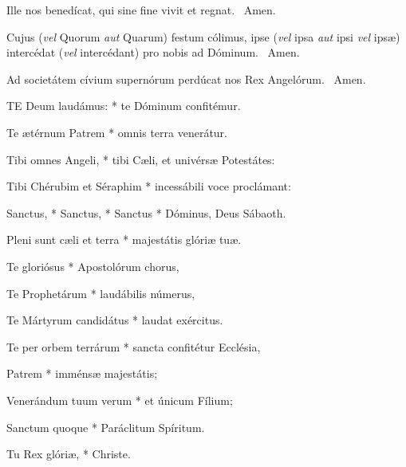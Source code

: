 
 Ille nos benedícat, qui sine fine vivit et regnat. \R\ Amen.

 Cujus (\textit{vel} Quorum \textit{aut} Quarum) festum cólimus, ipse (\textit{vel} ipsa \textit{aut} ipsi \textit{vel} ipsæ) intercédat (\textit{vel} intercédant) pro nobis ad Dóminum. \R\ Amen.

 Ad societátem cívium supernórum perdúcat nos Rex Angelórum. \R\ Amen.




\lettrine[lines=2]{T}{E} Deum laudámus: * te Dóminum confitémur.

Te ætérnum Patrem * omnis terra venerátur.

Tibi omnes Angeli, * tibi Cæli, et univérsæ Potestátes:

Tibi Chérubim et Séraphim * incessábili voce proclámant:

Sanctus, * Sanctus, * Sanctus * Dóminus, Deus Sábaoth.

Pleni sunt cæli et terra * majestátis glóriæ tuæ.

Te gloriósus * Apostolórum chorus,

Te Prophetárum * laudábilis númerus,

Te Mártyrum candidátus * laudat exércitus.

Te per orbem terrárum * sancta confitétur Ecclésia,

Patrem * imménsæ majestátis;

Venerándum tuum verum * et únicum Fílium;

Sanctum quoque * Paráclitum Spíritum.

Tu Rex glóriæ, * Christe.

